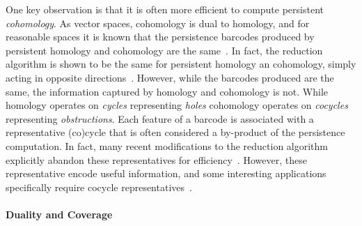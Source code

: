 One key observation is that it is often more efficient to compute persistent \emph{cohomology}.
As vector spaces, cohomology is dual to homology, and for reasonable spaces it is known that the persistence barcodes produced by persistent homology and cohomology are the same~\cite{todo}.
In fact, the reduction algorithm is shown to be the same for persistent homology an cohomology, simply acting in opposite directions~\cite{desilva11duality}.
However, while the barcodes produced are the same, the information captured by homology and cohomology is not.
While homology operates on \emph{cycles} representing \emph{holes} cohomology operates on \emph{cocycles} representing \emph{obstructions}.
Each feature of a barcode is associated with a representative (co)cycle that is often considered a by-product of the persistence computation.
In fact, many recent modifications to the reduction algorithm explicitly abandon these representatives for efficiency~\cite{todo}.
However, these representative encode useful information, and some interesting applications specifically require cocycle representatives~\cite{desilva11circular}.


%
%
%

\paragraph{Duality and Coverage}


